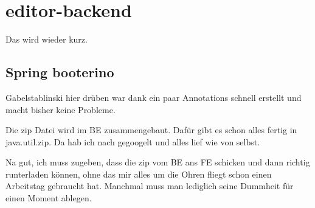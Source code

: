 \section{editor-backend}\label{sec:editor-backend}
Das wird wieder kurz.

\subsection{Spring booterino}\label{subsec:spring-booterino}
Gabelstablinski hier drüben war dank ein paar Annotations schnell erstellt und macht bisher keine Probleme.

Die zip Datei wird im BE zusammengebaut.
Dafür gibt es schon alles fertig in java.util.zip.
Da hab ich nach gegoogelt und alles lief wie von selbst.

Na gut, ich muss zugeben, dass die zip vom BE ans FE schicken und dann richtig runterladen können,
ohne das mir alles um die Ohren fliegt schon einen Arbeitstag gebraucht hat.
Manchmal muss man lediglich seine Dummheit für einen Moment ablegen.
